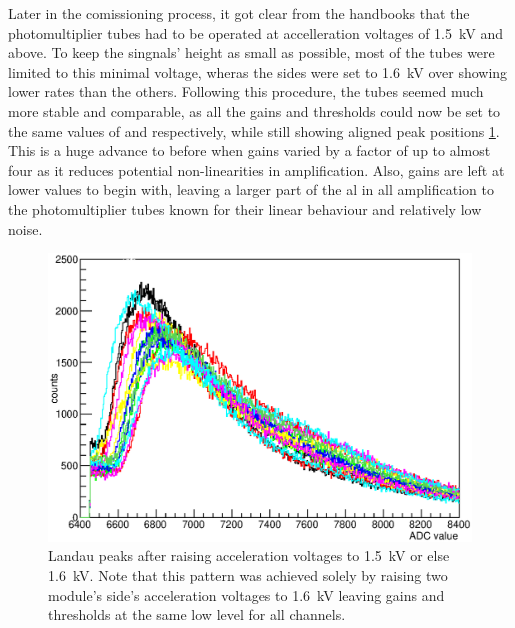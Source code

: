 	Later in the comissioning process, it got clear from the handbooks that the photomultiplier tubes had to be operated at accelleration voltages of \SI{1.5}{\kilo\volt} and above. To keep the singnals' height as small as possible, most of the tubes were limited to this minimal voltage, wheras the sides  were set to \SI{1.6}{\kilo\volt} over showing lower rates than the others. Following this procedure, the tubes seemed much more stable and comparable, as all the gains and thresholds could now be set to the same values of  and respectively, while still showing aligned peak positions \ref{fig:allPeaksAfter}. This is a huge advance to before when gains varied by a factor of up to almost four as it reduces potential non-linearities in amplification. Also, gains are left at lower values to begin with, leaving a larger part of the al in all amplification to the photomultiplier tubes known for their linear behaviour and relatively low noise.
  
	\begin{figure}
		\centering
		\includegraphics[width = 0.9 \textwidth]{graphics/setup/LandauPeaksRun1097_new.eps}
		\caption[Landau peak \SI{1500}{\volt} acceleration voltage]{Landau peaks after raising acceleration voltages to \SI{1.5}{\kilo\volt} or else \SI{1.6}{\kilo\volt}. Note that this pattern was achieved solely by raising two module's side's acceleration voltages to \SI{1.6}{\kilo\volt} leaving gains and thresholds at the same low level for all channels. }
		\label{fig:allPeaksAfter}
	\end{figure}



